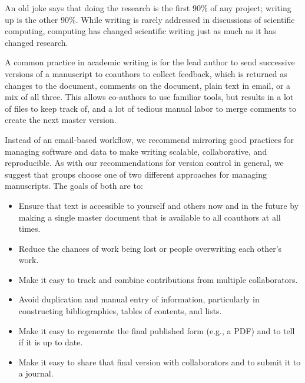 \documentclass[10pt,letterpaper]{article}
\begin{document}
An old joke says that doing the research is the first 90\% of any
project; writing up is the other 90\%. While writing is rarely
addressed in discussions of scientific computing, computing has
changed scientific writing just as much as it has changed research.

A common practice in academic writing is for the lead author to send
successive versions of a manuscript to coauthors to collect feedback,
which is returned as changes to the document, comments on the
document, plain text in email, or a mix of all three. This allows
co-authors to use familiar tools, but results in a lot of files to
keep track of, and a lot of tedious manual labor to merge comments to
create the next master version.

Instead of an email-based workflow, we recommend mirroring good
practices for managing software and data to make writing scalable,
collaborative, and reproducible.  As with our recommendations for
version control in general, we suggest that groups choose one of two
different approaches for managing manuscripts.  The goals of both are
to:

\begin{itemize}

\item

  Ensure that text is accessible to yourself and others now and in the
  future by making a single master document that is available to all
  coauthors at all times.

\item

  Reduce the chances of work being lost or people overwriting each
  other's work.

\item

  Make it easy to track and combine contributions from multiple
  collaborators.

\item

  Avoid duplication and manual entry of information, particularly in
  constructing bibliographies, tables of contents, and lists.

\item

  Make it easy to regenerate the final published form (e.g., a PDF)
  and to tell if it is up to date.

\item

  Make it easy to share that final version with collaborators and to
  submit it to a journal.

\end{itemize}
\end{document}
